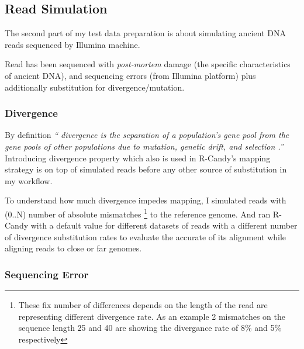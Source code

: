 \documentclass[11pt,a4paper]{report}
\newcommand{\quotes}[1]{``#1''}
\begin{document}

\subsection{Read Simulation} \label{Read Simulation}

The second part of my test data preparation is about simulating ancient DNA reads 
sequenced by Illumina machine.

Read has been sequenced with \emph{post-mortem }damage \cite{damagepattern} (the 
specific characteristics of ancient DNA), and sequencing errors \cite{phred1} (from
Illumina platform) plus additionally substitution for divergence/mutation.




\subsubsection{Divergence} \label{Divergence}

By definition \emph{\quotes{ divergence is the separation
of a population's gene pool from the gene pools of other populations 
due to mutation, genetic drift, and selection \cite{divergence1}.}}\\

Introducing divergence property which also is used in R-Candy's mapping strategy 
is on top of simulated reads before any other source of substitution in my workflow. 

To understand how much divergence impedes mapping, I simulated reads with (0..N) 
number of absolute mismatches \footnote {These fix number of differences depends 
on the length of the read are representing different divergence rate. As an example 
2 mismatches on the sequence length 25 and 40 are showing the divergance rate of 8\% 
and 5\% respectively} to the reference genome.
And ran R-Candy with a default value for different datasets of reads with a 
different number of divergence substitution rates to evaluate the accurate of its 
alignment while aligning reads to close or far genomes.
 
 

\subsubsection{Sequencing Error} \label{Sequencing Error}
 
\end{document}
